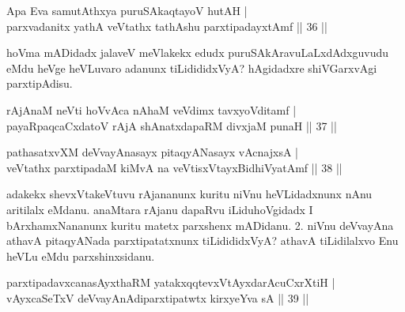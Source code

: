 
\begin{shl}
Apa Eva samutAthxya puruSAkaqtayoV hutAH | \\
parxvadanitx yathA veVtathx tathA\s \s shu parxtipadayxtAmf \hfill|| 36 || 
\end{shl}

\begin{artha}
hoVma mADidadx jalaveV meVlakekx edudx puruSAkAravuLaLxdAdxguvudu eMdu heVge heVLuvaro adanunx tiLidididxVyA? hAgidadxre shiVGarxvAgi parxtipAdisu.
\end{artha}

\begin{shl}
rAjAnaM neVti hoVvAca nAhaM veVdimx tavxyoVditamf | \\
payaRpaqcaCxdatoV rAjA shAnatxdapaRM divxjaM punaH \hfill|| 37 || 
\end{shl}

\begin{shl}
pathasatxvXM deVvayAnasayx pitaqyANasayx vA\s cnajxsA | \\
veVtathx parxtipadaM kiMvA na veVtisxVtayxBidhiVyatAmf \hfill|| 38 || 
\end{shl}

\begin{artha}
adakekx shevxVtakeVtuvu rAjananunx kuritu niVnu heVLidadxnunx nAnu 
aritilalx eMdanu. anaMtara rAjanu dapaRvu iLiduhoVgidadx I 
bArxhamxNananunx kuritu matetx parxshenx mADidanu. 2. niVnu deVvayAna 
athavA pitaqyANada parxtipatatxnunx tiLidididxVyA? athavA tiLidilalxvo 
Enu heVLu eMdu parxshinxsidanu.
\end{artha}


\begin{shl}
parxtipadavxcanasAyxthaRM \footnotemark[1]yatakxqqtevxVtAyxdarAcuCxrXtiH | \\
vAyxcaSeTxV deVvayAnAdiparxtipatwtx \footnotemark[2]kirxyeYva sA \hfill|| 39 || 
\end{shl}
\footnotetext[2]{}

